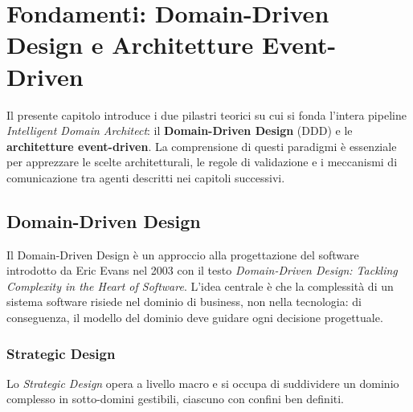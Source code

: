 \documentclass[12pt,a4paper]{report}
\begin{document}
\chapter{Fondamenti: Domain-Driven Design e Architetture Event-Driven}

Il presente capitolo introduce i due pilastri teorici su cui si fonda l'intera
pipeline \textit{Intelligent Domain Architect}: il \textbf{Domain-Driven Design}
(DDD) e le \textbf{architetture event-driven}. La comprensione di questi paradigmi
è essenziale per apprezzare le scelte architetturali, le regole di validazione e
i meccanismi di comunicazione tra agenti descritti nei capitoli successivi.

\section{Domain-Driven Design}

Il Domain-Driven Design è un approccio alla progettazione del software introdotto
da Eric Evans nel 2003 con il testo \textit{Domain-Driven Design: Tackling Complexity
in the Heart of Software}. L'idea centrale è che la complessità di un sistema
software risiede nel dominio di business, non nella tecnologia: di conseguenza,
il modello del dominio deve guidare ogni decisione progettuale.

\subsection{Strategic Design}

Lo \textit{Strategic Design} opera a livello macro e si occupa di suddividere un
dominio complesso in sotto-domini gestibili, ciascuno con confini ben definiti.
\end{document}

